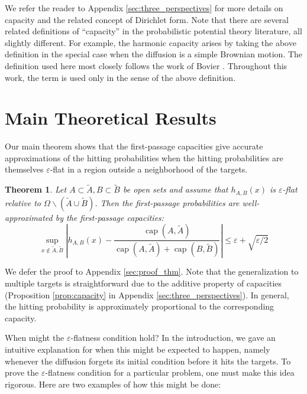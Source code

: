 \documentclass[12pt, nofootinbib,english, amsmath, amssymb, aps, priprint, graphicx,floatfix]{revtex4-1}
\newtheorem{theorem}{Theorem}
\theoremstyle{plain}
\theoremstyle{definition}
\theoremstyle{plain}
\newcommand{\capac}[2]{\ensuremath{\operatorname{cap}}(#1,#2)}
\begin{document}
We refer the reader to Appendix \ref{sec:three_perspectives} for more details on capacity and the related concept of Dirichlet form.  Note that there are several related definitions of ``capacity'' in the probabilistic potential theory literature, all slightly different.  For example, the harmonic capacity arises by taking the above definition in the special case when the diffusion is a simple Brownian motion.  The definition used here most closely follows the work of Bovier \cite{Bovier2016-ez,Bovier2004-wj}.  Throughout this work, the term is used only in the sense of the above definition.

\section{Main Theoretical Results}
\label{sec:MainResults}

Our main theorem shows that the first-passage capacities give accurate approximations of the hitting probabilities when the hitting probabilities are themselves $\varepsilon$-flat in a region outside a neighborhood of the targets.

\begin{theorem}\label{thm:main_thm}
Let $A\subset \tilde A,B\subset \tilde B$ be open sets and assume that  $h_{A,B}(x)$ is $\varepsilon$-flat relative to
$\Omega \backslash (\tilde A \cup \tilde B)$.
Then the first-passage probabilities are well-approximated by the first-passage capacities:
\[ \sup_{x \notin \tilde A,\tilde B} \left| h_{A,B} (x) - \frac{\capac{A}{\tilde A}}{\capac{A}{\tilde A}+\capac{B}{\tilde B}} \right| \leqslant \varepsilon + \sqrt{\varepsilon/2} \]
\end{theorem}

We defer the proof to Appendix \ref{sec:proof_thm}.  Note that the generalization to multiple targets is straightforward due to the additive property of capacities (Proposition \ref{prop:capacity} in Appendix \ref{sec:three_perspectives}).  In general, the hitting probability is approximately proportional to the corresponding capacity.

When might the $\varepsilon$-flatness condition hold?  In the introduction, we gave an intuitive explanation for when this might be expected to happen, namely whenever the diffusion forgets its initial condition before it hits the targets.  To prove the $\varepsilon$-flatness condition for a particular problem, one must make this idea rigorous. Here are two examples of how this might be done: 
\end{document}
